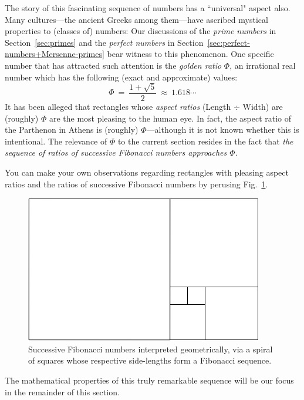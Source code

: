 \medskip

 
The story of this fascinating sequence of numbers has a ``universal" aspect also.  Many cultures---the ancient Greeks among them---have ascribed mystical properties to (classes of) numbers:  Our discussions of the {\it prime numbers} in Section~\ref{sec:primes} and the {\it perfect numbers} in Section~\ref{sec:perfect-numbers+Mersenne-primes} bear witness to this
phenomenon.  One specific number that has attracted such attention is the {\it golden ratio} $\Phi$, an irrational real number which has the following (exact and approximate) values: 
\[ \Phi \ = \ \frac{1+\sqrt{5}}{2} \ \approx \  1.618\cdots \]
It has been alleged that rectangles whose {\it aspect ratios} (Length $\div$ Width) are (roughly) $\Phi$ are the most pleasing to the human eye.  In fact, the aspect ratio of the Parthenon in Athens is (roughly) $\Phi$---although it is not known whether this is intentional.  The relevance of $\Phi$ to the current section resides in the fact that {\em the sequence of ratios of successive Fibonacci numbers approaches $\Phi$}.

\smallskip

You can make your own observations regarding rectangles with pleasing aspect ratios and the ratios of successive Fibonacci numbers by perusing Fig.~\ref{fig:fibosquare}.
\begin{figure}[htb]
\begin{center}
        \includegraphics[scale=0.35]{FiguresMaths//Fiboembedded}
\caption{Successive Fibonacci numbers interpreted geometrically, via a spiral of squares whose respective side-lengths form a Fibonacci sequence.}
        \label{fig:fibosquare}
\end{center}
\end{figure}

The mathematical properties of this truly remarkable sequence will be our focus in the remainder of this section.


